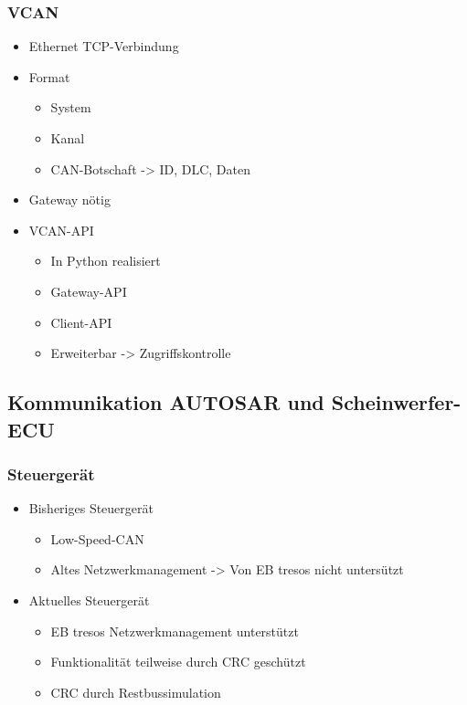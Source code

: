 \documentclass[]{beamer}
\begin{document}
\begin{frame}
\frametitle{VCAN}
    \begin{itemize}
        \item Ethernet TCP-Verbindung
        \item Format
        \begin{itemize}
            \item System
            \item Kanal
            \item CAN-Botschaft -> ID, DLC, Daten
        \end{itemize}        
        \item Gateway nötig
        \item VCAN-API
        \begin{itemize}
            \item In Python realisiert
            \item Gateway-API
            \item Client-API
            \item Erweiterbar -> Zugriffskontrolle
        \end{itemize}
    \end{itemize}
\end{frame}




\subsection{Kommunikation AUTOSAR und Scheinwerfer-ECU}
\begin{frame}
\frametitle{Steuergerät}
    \begin{itemize}
        \item Bisheriges Steuergerät
        \begin{itemize}
            \item Low-Speed-CAN
            \item Altes Netzwerkmanagement -> Von EB tresos nicht untersützt
        \end{itemize}
        \item Aktuelles Steuergerät
        \begin{itemize}
            \item EB tresos Netzwerkmanagement unterstützt
            \item Funktionalität teilweise durch CRC geschützt
            \item CRC durch Restbussimulation
        \end{itemize}
    \end{itemize}
\end{frame}
\end{document}
